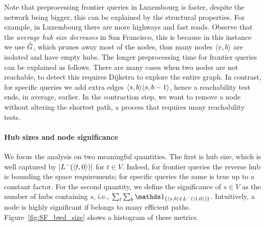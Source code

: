 Note that preprocessing frontier queries in Luxembourg is faster, despite the network being bigger, this can be explained by the structural properties.
For example, in Luxembourg there are more highways and fast roads.
Observe that the \emph{average hub size decreases} in San Francisco, this is because in this instance we use $\tilde G$, which prunes away most of the nodes, thus many nodes $\langle v,b\rangle$ are isolated and have empty hubs.
The longer preprocessing time for frontier queries can be explained as follows.
There are many cases when two nodes are not reachable, to detect this requires Dijkstra to explore the entire graph.
In contrast, for specific queries we add extra edges $\langle s,b\rangle\langle s,b-1\rangle$, hence a reachability test ends, in average, earlier.
In the contraction step, we want to remove a node without altering the shortest path, a process that requires many reachability tests.


\paragraph{Hub sizes and node significance}
We focus the analysis on two meaningful quantities.
The first is hub size, which is well captured by  $\lvert L^-(\langle t,0\rangle)\rvert$ for $t\in V$.
Indeed, for frontier queries the reverse hub is bounding the space requirements; for specific queries the same is true up to a constant factor.
For the second quantity, we define the significance of $s\in V$ as the number of hubs containing $s$, i.e., $\sum_t\sum_b\In{\pp{s,b}\in \Lb(\pp{t,0})}$.
Intuitively, a node is highly significant if belongs to many efficient paths.
Figure~\ref{fig:SF_bwd_size} shows a histogram of these metrics. 

	

